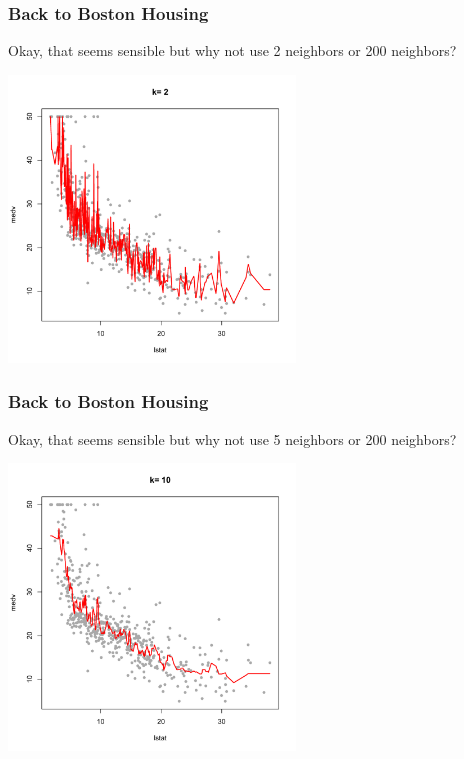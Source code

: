 \documentclass[flegn]{beamer}
\begin{document}
\begin{frame}
\frametitle{Back to Boston Housing}
{\color{blue}Okay, that seems sensible but why not use 2 neighbors or 200 neighbors? }

\vspace{-0.5cm}
\begin{center}
\includegraphics[width=3in]{k2}
\end{center}
\end{frame}


\begin{frame}
\frametitle{Back to Boston Housing}
{\color{blue}Okay, that seems sensible but why not use 5 neighbors or 200 neighbors? }

\vspace{-0.5cm}
\begin{center}
\includegraphics[width=3in]{k10}
\end{center}
\end{frame}
\end{document}

